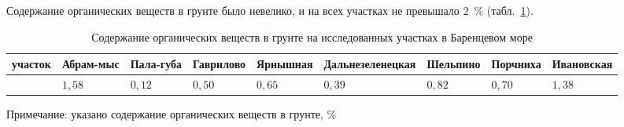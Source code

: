 Содержание   органических   веществ   в   грунте   было   невелико,   и   на   всех   участках   не превышало $2$~\% (табл.~\ref{tab:grunt_granulometriya_Barents}).
    \begin{table}[ht]
    \caption{Содержание органических веществ в грунте на исследованных участках в Баренцевом море}
    \label{tab:grunt_granulometriya_Barents}
    \begin{tabularx}{\textwidth}{|*{9}{X|}} \hline
    участок & Абрам-мыс &   Пала-губа &  Гав\-ри\-ло\-во  & Яр\-ныш\-ная &   Даль\-не\-зе\-ле\-нец\-кая &  Шель\-пи\-но &   Порч\-ни\-ха &   Ива\-нов\-ская
        \\ \hline
     &  $1,58$ &    $0,12$ &   $0,50$ &   $0,65$ &   $0,39$ &   $0,82$ &   $0,70$ & $1,38$
        \\ \hline
    \end{tabularx}

    {\footnotesize Примечание: указано содержание органических веществ в грунте, \%}
    \end{table}


